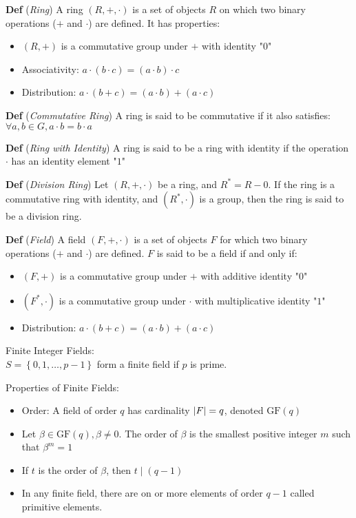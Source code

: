 \documentclass[12pt,landscape]{article}
\newcommand{\tab}{\hspace{.02\textwidth}}
\newcommand{\defn}[1]{\textbf{Def} (\emph{#1})}
\newcommand{\set}[1]{\left\{ #1 \right\}}
\newcommand{\gf}[1]{\text{GF}(#1)}
\begin{document}
\begin{multicols*}{3}
\defn{Ring} A ring $(R, +, \cdot)$ is a set of objects $R$ on which two binary operations ($+$ and $\cdot$) are defined. It has properties:
\vspace{-0.5em}
\begin{itemize}[itemsep=0em]
    \item $(R, +)$ is a commutative group under $+$ with identity "$0$"
    \item Associativity: $a \cdot (b \cdot c) = (a \cdot b) \cdot c$
    \item Distribution: $a \cdot (b + c) = (a \cdot b) + (a \cdot c)$
\end{itemize}

\defn{Commutative Ring} A ring is said to be commutative if it also satisfies: $\forall a,b \in G, a \cdot b = b \cdot a$

\defn{Ring with Identity} A ring is said to be a ring with identity if the operation $\cdot$ has an identity element "$1$"

\defn{Division Ring} Let $(R, +, \cdot)$ be a ring, and $R^* = R - {0}$. If the ring is a commutative ring with identity, and $(R^*, \cdot)$ is a group, then the ring is said to be a division ring.

\defn{Field} A field $(F, +, \cdot)$ is a set of objects $F$ for which two binary operations ($+$ and $\cdot$) are defined. $F$ is said to be a field if and only if:
\vspace{-0.5em}
\begin{itemize}[itemsep=0em]
    \item $(F,+)$ is a commutative group under $+$ with additive identity "$0$"
    \item $(F^*, \cdot)$ is a commutative group under $\cdot$ with multiplicative identity "$1$"
    \item Distribution: $a \cdot (b + c) = (a \cdot b) + (a \cdot c)$
\end{itemize}

Finite Integer Fields:\\
\tab $S = \set{0, 1, \ldots, p - 1}$ form a finite field if $p$ is prime.

Properties of Finite Fields:\\
\vspace{-0.5em}
\begin{itemize}[itemsep=0em]
    \item Order: A field of order $q$ has cardinality $\abs{F} = q$, denoted $\gf{q}$
    \item Let $\beta \in \gf{q}, \beta \neq 0$. The order of $\beta$ is the smallest positive integer $m$ such that $\beta^m = 1$
    \item If $t$ is the order of $\beta$, then $t \mid (q - 1)$
    \item In any finite field, there are on or more elements of order $q-1$ called primitive elements.
\end{itemize}


\end{multicols*}
\end{document}
